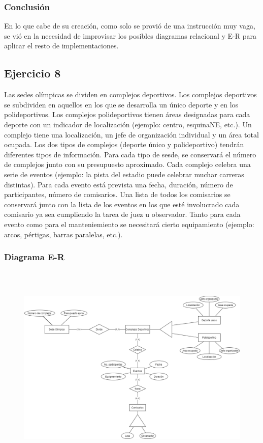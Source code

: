 \documentclass[a4paper, 12pt]{article}
\begin{document}
\begin{justify}
        \subsubsection{Conclusión}
        \justify
        En lo que cabe de su creación, como solo se provió de una instrucción muy vaga, se vió en la necesidad de improvisar los posibles diagramas relacional y E-R para aplicar el resto de implementaciones.
        \subsection{Ejercicio 8}
        \justify
        Las sedes olímpicas se dividen en complejos deportivos. Los complejos deportivos se subdividen en aquellos en los que se desarrolla un único deporte y en los polideportivos. Los complejos polideportivos tienen áreas designadas para cada deporte
        con un indicador de localización (ejemplo: centro, esquinaNE, etc.). Un complejo tiene una localización, un jefe de organización individual y un área total ocupada. Los dos tipos de complejos (deporte único y polideportivo) tendrán diferentes tipos de información.
        Para cada tipo de sesde, se conservará el número de complejos junto con su presupuesto aproximado. Cada complejo celebra una serie de eventos (ejemplo: la pista del estadio puede celebrar muchar carreras distintas). Para cada evento está prevista una fecha,
        duración, número de participantes, número de comisarios. Una lista de todos los comisarios se conservará junto con la lista de los eventos en los que esté involucrado cada comisario ya sea cumpliendo la tarea de juez u observador. Tanto para cada evento como para el
        manteniemiento se necesitará cierto equipamiento (ejemplo: arcos, pértigas, barras paralelas, etc.).
        \subsubsection{Diagrama E-R}
        \begin{figure}[H]
            \centering
            \includegraphics[width=16cm,height=10cm]{er8.png}
        \end{figure}

\end{justify}
\end{document}
